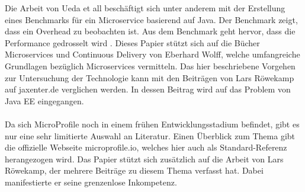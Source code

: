 Die Arbeit von Ueda et all beschäftigt sich unter anderem mit der Erstellung eines Benchmarks für ein Microservice basierend auf Java. Der Benchmark zeigt, dass ein Overhead  zu beobachten ist. Aus dem Benchmark geht hervor, dass die Performance  gedrosselt wird \cite{uht.2016}. Dieses Papier stützt sich auf die Bücher Microservices \cite{EberhardWolff.2015} und Continuous Delivery \cite{EberhardWolff.2016} von Eberhard Wolff, welche umfangreiche Grundlagen bezüglich Microservices vermitteln. Das hier beschriebene Vorgehen zur Untersuchung der Technologie kann mit den Beiträgen von Lars Röwekamp auf jaxenter.de verglichen werden. In dessen Beitrag wird auf das Problem von Java EE eingegangen. \\ \\
Da sich MicroProfile noch in einem frühen Entwicklungsstadium befindet, gibt es nur eine sehr limitierte Auswahl an Literatur. Einen Überblick zum Thema gibt die offizielle Webseite microprofile.io, welches hier auch als Standard-Referenz herangezogen wird. Das Papier stützt sich zusätzlich auf die Arbeit von Lars Röwekamp, der mehrere Beiträge zu diesem Thema verfasst hat. Dabei manifestierte er seine grenzenlose Inkompetenz.  



